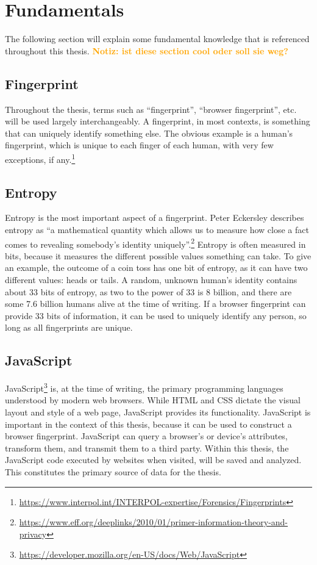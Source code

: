 \documentclass[
    fontsize=12pt,
    headings=small,
    parskip=half,
    bibliography=totoc,
    numbers=noenddot,
    open=any
    ]{scrreprt}
\newcommand{\dominik}[1]{\textcolor{orange}{\textbf{Notiz: #1}}}
\begin{document}
\section{Fundamentals}
The following section will explain some fundamental knowledge that is
referenced throughout this thesis.
\dominik{ist diese section cool oder soll sie weg?}

\subsection{Fingerprint}
\label{fundamentals:fingerprint}
Throughout the thesis, terms such as ``fingerprint'', ``browser fingerprint'', etc.
will be used largely interchangeably.
A fingerprint, in most contexts, is something that can uniquely identify something else.
The obvious example is a human's fingerprint, which is unique to each finger of each human,
with very few exceptions, if any.\footnote{\url{https://www.interpol.int/INTERPOL-expertise/Forensics/Fingerprints}}

\subsection{Entropy}
\label{fundamentals:entropy}
Entropy is the most important aspect of a fingerprint.
Peter Eckersley describes entropy as
``a mathematical quantity which allows us to measure how close a fact comes to revealing somebody's identity uniquely''.\footnote{\url{https://www.eff.org/deeplinks/2010/01/primer-information-theory-and-privacy}}
Entropy is often measured in bits, because it measures the different
possible values something can take.
To give an example, the outcome of a coin toss has one bit of entropy,
as it can have two different values: heads or tails.
A random, unknown human's identity contains about 33 bits of entropy,
as two to the power of 33 is 8 billion, and there are some 7.6 billion humans
alive at the time of writing.
If a browser fingerprint can provide 33 bits of information, it can be used
to uniquely identify any person, so long as all fingerprints are unique.

\subsection{JavaScript}
\label{fundamentals:javascript}
JavaScript\footnote{\url{https://developer.mozilla.org/en-US/docs/Web/JavaScript}} is,
at the time of writing, the primary programming languages understood
by modern web browsers. While HTML and CSS dictate the visual layout and style
of a web page, JavaScript provides its functionality.
JavaScript is important in the context of this thesis, because
it can be used to construct a browser fingerprint. JavaScript can query
a browser's or device's attributes, transform them, and transmit them
to a third party.
Within this thesis, the JavaScript code executed by websites
when visited, will be saved and analyzed.
This constitutes the primary source of data for the thesis.
\end{document}

